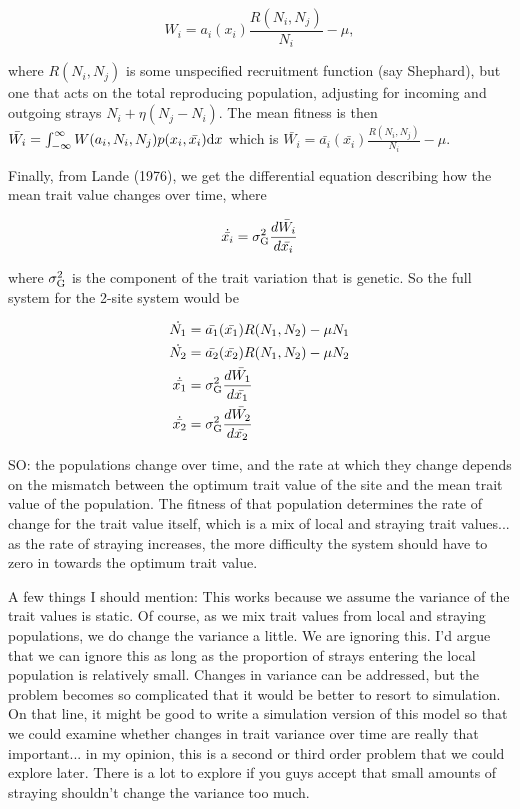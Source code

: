 \documentclass[twocolumn,preprintnumbers,amsmath,amssymb,superscriptaddress]{revtex4}
\begin{document}
\begin{equation}
  W_i = a_i(x_i)\frac{R(N_i,N_j)}{N_i}-\mu,
\end{equation}

\noindent where $R(N_i,N_j)$ is some unspecified recruitment function (say Shephard), but one that acts on the total reproducing population, adjusting for incoming and outgoing strays $N_i + \eta(N_j - N_i)$.
The mean fitness is then $\bar{W_i}=\int_{-\infty}^\infty W(a_i,N_i,N_j)p(x_i,\bar{x_i}){\rm d}x$ which is $\bar{W_i}=\bar{a_i}(\bar{x_i})\frac{R(N_i,N_j)}{N_i}-\mu$.

Finally, from Lande (1976), we get the differential equation describing how the mean trait value changes over time, where

\begin{equation}
  \dot{\bar{x_i}} = \sigma^2_{\rm G} \frac{d\bar{W_i}}{d\bar{x_i}}
\end{equation}

\noindent where $\sigma^2_{\rm G}$ is the component of the trait variation that is genetic.
So the full system for the 2-site system would be

\begin{align}
  \dot{N_1} &= \bar{a_1}(\bar{x_1})R(N_1,N_2)-\mu N_1 \\
  \dot{N_2} &= \bar{a_2}(\bar{x_2})R(N_1,N_2)-\mu N_2 \\
  \dot{\bar{x_1}} &= \sigma^2_{\rm G} \frac{d\bar{W_1}}{d\bar{x_1}} \\
  \dot{\bar{x_2}} &= \sigma^2_{\rm G} \frac{d\bar{W_2}}{d\bar{x_2}}
\end{align}

SO: the populations change over time, and the rate at which they change depends on the mismatch between the optimum trait value of the site and the mean trait value of the population.
The fitness of that population determines the rate of change for the trait value itself, which is a mix of local and straying trait values... as the rate of straying increases, the more difficulty the system should have to zero in towards the optimum trait value.

A few things I should mention: This works because we assume the variance of the trait values is static.
Of course, as we mix trait values from local and straying populations, we do change the variance a little.
We are ignoring this.
I'd argue that we can ignore this as long as the proportion of strays entering the local population is relatively small.
Changes in variance can be addressed, but the problem becomes so complicated that it would be better to resort to simulation.
On that line, it might be good to write a simulation version of this model so that we could examine whether changes in trait variance over time are really that important... in my opinion, this is a second or third order problem that we could explore later.
There is a lot to explore if you guys accept that small amounts of straying shouldn't change the variance too much.
\end{document}
